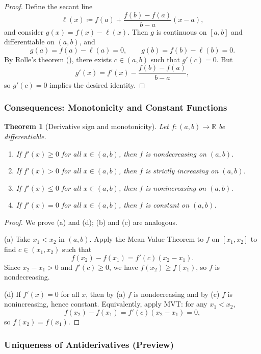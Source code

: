 \documentclass[12pt]{article}
\numberwithin{equation}{section}
\newcommand{\RR}{\mathbb{R}}
\theoremstyle{plain}
\newtheorem{theorem}{Theorem}[section]
\theoremstyle{definition}
\theoremstyle{remark}
\begin{document}
\begin{proof}
Define the secant line
\[
\ell(x)\coloneqq f(a)+\frac{f(b)-f(a)}{b-a}(x-a),
\]
and consider $g(x)=f(x)-\ell(x)$.
Then $g$ is continuous on $[a,b]$ and differentiable on $(a,b)$, and
\[
g(a)=f(a)-\ell(a)=0,\qquad g(b)=f(b)-\ell(b)=0.
\]
By Rolle's theorem (), there exists $c\in(a,b)$ such that $g'(c)=0$.
But
\[
g'(x)=f'(x)-\frac{f(b)-f(a)}{b-a},
\]
so $g'(c)=0$ implies the desired identity.
\end{proof}

\subsubsection{Consequences: Monotonicity and Constant Functions}

\begin{theorem}[Derivative sign and monotonicity]\label{thm:monotone-deriv}
Let $f:(a,b)\to\RR$ be differentiable.
\begin{enumerate}[label=(\alph*)]
\item If $f'(x)\ge 0$ for all $x\in(a,b)$, then $f$ is nondecreasing on $(a,b)$.
\item If $f'(x)>0$ for all $x\in(a,b)$, then $f$ is strictly increasing on $(a,b)$.
\item If $f'(x)\le 0$ for all $x\in(a,b)$, then $f$ is nonincreasing on $(a,b)$.
\item If $f'(x)=0$ for all $x\in(a,b)$, then $f$ is constant on $(a,b)$.
\end{enumerate}
\end{theorem}

\begin{proof}
We prove (a) and (d); (b) and (c) are analogous.

(a) Take $x_1<x_2$ in $(a,b)$.
Apply the Mean Value Theorem to $f$ on $[x_1,x_2]$ to find $c\in(x_1,x_2)$ such that
\[
f(x_2)-f(x_1)=f'(c)(x_2-x_1).
\]
Since $x_2-x_1>0$ and $f'(c)\ge 0$, we have $f(x_2)\ge f(x_1)$, so $f$ is nondecreasing.

(d) If $f'(x)=0$ for all $x$, then by (a) $f$ is nondecreasing and by (c) $f$ is nonincreasing, hence constant.
Equivalently, apply MVT: for any $x_1<x_2$,
\[
f(x_2)-f(x_1)=f'(c)(x_2-x_1)=0,
\]
so $f(x_2)=f(x_1)$.
\end{proof}

\subsubsection{Uniqueness of Antiderivatives (Preview)}
\end{document}
